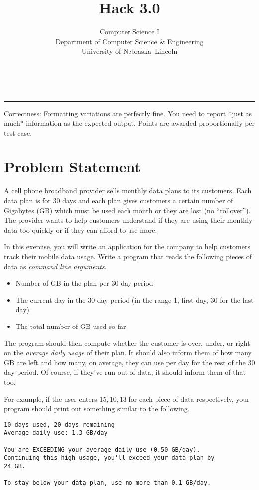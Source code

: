 \documentclass[12pt]{scrartcl}
\title{Hack 3.0}\let\Title\@title
\subtitle{Computer Science I\\
{\small
\vskip1cm
Department of Computer Science \& Engineering \\
University of Nebraska--Lincoln}
\vskip-1cm}
\date{~}
\begin{document}
\maketitle

\hrule

 

Correctness: Formatting variations are perfectly fine.  You need to
report *just as much* information as the expected output.
Points are awarded proportionally per test case.

\section*{Problem Statement}

A cell phone broadband provider sells monthly data plans to its
customers.  Each data plan is for 30 days and each plan gives
customers a certain number of Gigabytes (GB) which must be used 
each month or they are lost (no ``rollover'').  The provider wants
to help customers understand if they are using their monthly data
too quickly or if they can afford to use more.

In this exercise, you will write an application for the company
to help customers track their mobile data usage.  Write a program
that reads the following pieces of data as \emph{command line arguments}.
\begin{itemize}
  \item Number of GB in the plan per 30 day period
  \item The current day in the 30 day period (in the range 1, first day, 
  30 for the last day)
  \item The total number of GB used so far
\end{itemize}
The program should then compute whether the customer is over, 
under, or right on the \emph{average daily usage} of their plan.  
It should also inform them of how many GB are left and how many, 
on average, they can use per day for the rest of the 30 day period.  
Of course, if they've run out of data, it should inform them of that 
too.

For example, if the user enters $15, 10, 13$ for each piece of data
respectively, your program should print out something similar to 
the following.

\begin{verbatim}
10 days used, 20 days remaining
Average daily use: 1.3 GB/day

You are EXCEEDING your average daily use (0.50 GB/day).
Continuing this high usage, you'll exceed your data plan by
24 GB.

To stay below your data plan, use no more than 0.1 GB/day.
\end{verbatim}
\end{document}
